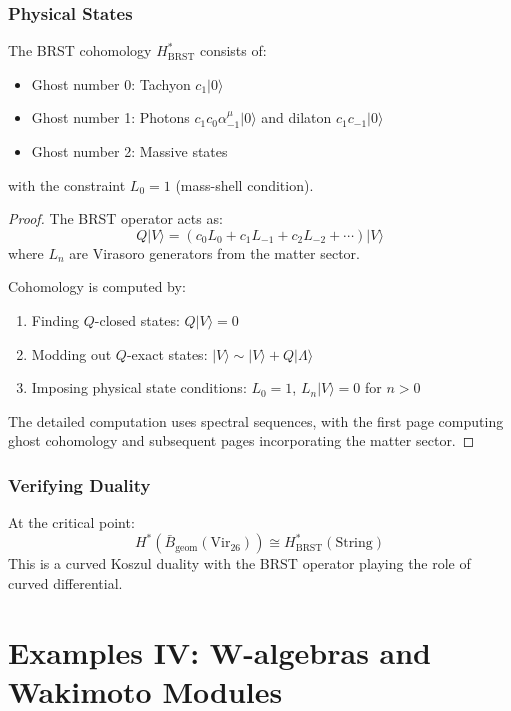 \subsubsection{Physical States}
 
\begin{theorem}
The BRST cohomology $H^*_{\text{BRST}}$ consists of:
\begin{itemize}
\item Ghost number 0: Tachyon $c_1|0\rangle$
\item Ghost number 1: Photons $c_1c_0\alpha^\mu_{-1}|0\rangle$ and dilaton $c_1c_{-1}|0\rangle$
\item Ghost number 2: Massive states
\end{itemize}
with the constraint $L_0 = 1$ (mass-shell condition).
\end{theorem}
 
\begin{proof}
The BRST operator acts as:
\[
Q|V\rangle = \left(c_0L_0 + c_1L_{-1} + c_2L_{-2} + \cdots\right)|V\rangle
\]
where $L_n$ are Virasoro generators from the matter sector.
 
Cohomology is computed by:
\begin{enumerate}
\item Finding $Q$-closed states: $Q|V\rangle = 0$
\item Modding out $Q$-exact states: $|V\rangle \sim |V\rangle + Q|\Lambda\rangle$
\item Imposing physical state conditions: $L_0 = 1$, $L_n|V\rangle = 0$ for $n > 0$
\end{enumerate}
 
The detailed computation uses spectral sequences, with the first page computing ghost cohomology and 
subsequent pages incorporating the matter sector.
\end{proof}
 
\subsubsection{Verifying Duality}
 
\begin{theorem}
At the critical point:
\[
H^*(\bar{B}_{\text{geom}}(\text{Vir}_{26})) \cong H^*_{\text{BRST}}(\text{String})
\]
This is a curved Koszul duality with the BRST operator playing the role of curved differential.
\end{theorem}
 
\section{Examples IV: W-algebras and Wakimoto Modules}

